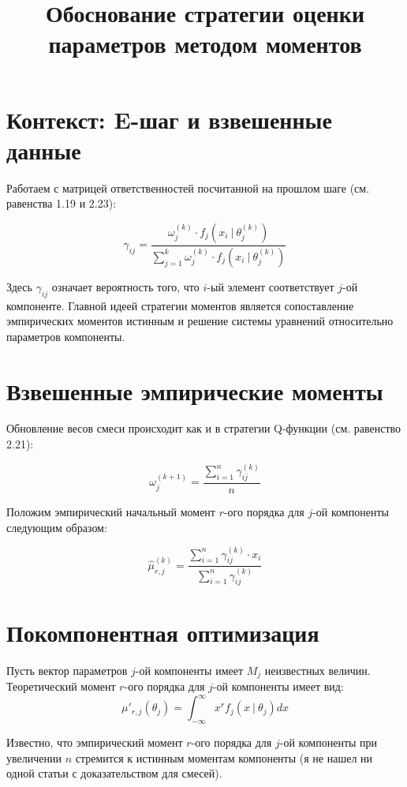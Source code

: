 \documentclass[14pt, a4paper, oneside]{memoir}
\title{Обоснование стратегии оценки параметров методом моментов}
\begin{document}
\begin{titlingpage}
	\maketitle
\end{titlingpage}

\section{Контекст: E-шаг и взвешенные данные}

Работаем с матрицей ответственностей посчитанной на прошлом шаге \cite{mclachlan2000finite}{ (см. равенства 1.19 и 2.23)}:

\[\gamma_{ij} = \frac{\omega_j^{(k)} \cdot f_j(x_i ~|~ \theta_j^{(k)})}{\sum_{j=1}^k \omega_j^{(k)} \cdot f_j(x_i ~|~ \theta_j^{(k)})}\]

Здесь $\gamma_{ij}$ означает вероятность того, что $i$-ый элемент соответствует $j$-ой компоненте.
Главной идеей стратегии моментов является сопоставление эмпирических моментов истинным и решение системы уравнений относительно параметров компоненты.

\section{Взвешенные эмпирические моменты}

Обновление весов смеси происходит как и в стратегии Q-функции \cite{mclachlan2000finite}{ (см. равенство 2.21)}:

\[\omega_j^{(k+1)} = \frac{\sum_{i=1}^n \gamma^{(k)}_{ij}}{n}\]

Положим эмпирический начальный момент $r$-ого порядка для $j$-ой компоненты следующим образом:

\[\hat{\mu}_{r,j}^{(k)} = \frac{\sum_{i=1}^n \gamma^{(k)}_{ij} \cdot x_i}{\sum_{i=1}^n \gamma^{(k)}_{ij} }\]

\section{Покомпонентная оптимизация}

Пусть вектор параметров $j$-ой компоненты имеет $M_j$ неизвестных величин. Теоретический момент $r$-ого порядка для $j$-ой компоненты имеет вид:
\[\mu'_{r, j}(\theta_j) = \int_{-\infty}^\infty x^r f_j(x ~|~ \theta_j)dx\]

Известно, что эмпирический момент $r$-ого порядка для $j$-ой компоненты при увеличении $n$ стремится к истинным моментам компоненты (я не нашел ни одной статьи с доказательством для смесей).
\end{document}
